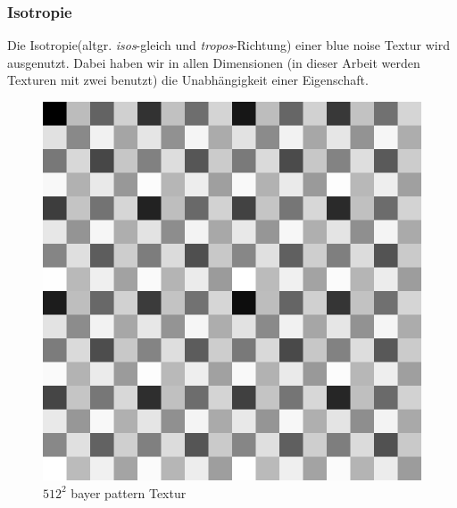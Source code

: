 \subsubsection{Isotropie}
Die Isotropie(altgr. \textit{isos}-gleich und \textit{tropos}-Richtung)
einer blue noise Textur wird ausgenutzt. Dabei haben wir in allen
Dimensionen (in dieser Arbeit werden Texturen mit zwei benutzt) 
die Unabhängigkeit einer Eigenschaft. 

\begin{figure}[H]\label{pic:bayerPatternFFT}
    \centering
    \begin{minipage}[t]{0.45\linewidth}
        \centering
        \includegraphics[width=\linewidth]{content/BlueNoise/Bilder/BayerMatrix.png}
        \caption{$512^{2}$ bayer pattern Textur}
    \end{minipage}
    \hfill
    \begin{minipage}[t]{0.45\linewidth}
        \centering

\end{minipage}
\end{figure}
